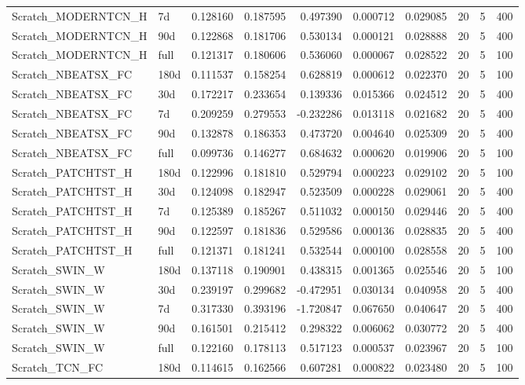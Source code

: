 \begin{tabular}{llrrrrrrrr}
Scratch\_MODERNTCN\_H & 7d & 0.128160 & 0.187595 & 0.497390 & 0.000712 & 0.029085 & 20 & 5 & 400 \\
Scratch\_MODERNTCN\_H & 90d & 0.122868 & 0.181706 & 0.530134 & 0.000121 & 0.028888 & 20 & 5 & 400 \\
Scratch\_MODERNTCN\_H & full & 0.121317 & 0.180606 & 0.536060 & 0.000067 & 0.028522 & 20 & 5 & 100 \\
Scratch\_NBEATSX\_FC & 180d & 0.111537 & 0.158254 & 0.628819 & 0.000612 & 0.022370 & 20 & 5 & 100 \\
Scratch\_NBEATSX\_FC & 30d & 0.172217 & 0.233654 & 0.139336 & 0.015366 & 0.024512 & 20 & 5 & 400 \\
Scratch\_NBEATSX\_FC & 7d & 0.209259 & 0.279553 & -0.232286 & 0.013118 & 0.021682 & 20 & 5 & 400 \\
Scratch\_NBEATSX\_FC & 90d & 0.132878 & 0.186353 & 0.473720 & 0.004640 & 0.025309 & 20 & 5 & 400 \\
Scratch\_NBEATSX\_FC & full & 0.099736 & 0.146277 & 0.684632 & 0.000620 & 0.019906 & 20 & 5 & 100 \\
Scratch\_PATCHTST\_H & 180d & 0.122996 & 0.181810 & 0.529794 & 0.000223 & 0.029102 & 20 & 5 & 100 \\
Scratch\_PATCHTST\_H & 30d & 0.124098 & 0.182947 & 0.523509 & 0.000228 & 0.029061 & 20 & 5 & 400 \\
Scratch\_PATCHTST\_H & 7d & 0.125389 & 0.185267 & 0.511032 & 0.000150 & 0.029446 & 20 & 5 & 400 \\
Scratch\_PATCHTST\_H & 90d & 0.122597 & 0.181836 & 0.529586 & 0.000136 & 0.028835 & 20 & 5 & 400 \\
Scratch\_PATCHTST\_H & full & 0.121371 & 0.181241 & 0.532544 & 0.000100 & 0.028558 & 20 & 5 & 100 \\
Scratch\_SWIN\_W & 180d & 0.137118 & 0.190901 & 0.438315 & 0.001365 & 0.025546 & 20 & 5 & 100 \\
Scratch\_SWIN\_W & 30d & 0.239197 & 0.299682 & -0.472951 & 0.030134 & 0.040958 & 20 & 5 & 400 \\
Scratch\_SWIN\_W & 7d & 0.317330 & 0.393196 & -1.720847 & 0.067650 & 0.040647 & 20 & 5 & 400 \\
Scratch\_SWIN\_W & 90d & 0.161501 & 0.215412 & 0.298322 & 0.006062 & 0.030772 & 20 & 5 & 400 \\
Scratch\_SWIN\_W & full & 0.122160 & 0.178113 & 0.517123 & 0.000537 & 0.023967 & 20 & 5 & 100 \\
Scratch\_TCN\_FC & 180d & 0.114615 & 0.162566 & 0.607281 & 0.000822 & 0.023480 & 20 & 5 & 100 \\

\end{tabular}
